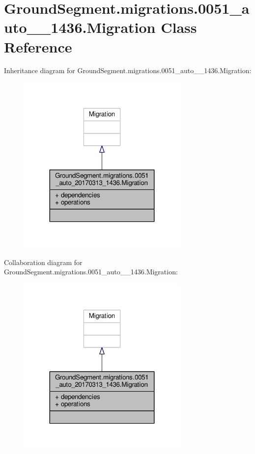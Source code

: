 \hypertarget{class_ground_segment_1_1migrations_1_10051__auto__20170313__1436_1_1_migration}{}\section{Ground\+Segment.\+migrations.0051\+\_\+auto\+\_\+\_\+1436.Migration Class Reference}
\label{class_ground_segment_1_1migrations_1_10051__auto__20170313__1436_1_1_migration}


Inheritance diagram for Ground\+Segment.\+migrations.0051\+\_\+auto\+\_\+\_\+1436.Migration\+:\nopagebreak
\begin{figure}[H]
\begin{center}
\leavevmode
\includegraphics[width=239pt]{class_ground_segment_1_1migrations_1_10051__auto__20170313__1436_1_1_migration__inherit__graph}
\end{center}
\end{figure}


Collaboration diagram for Ground\+Segment.\+migrations.0051\+\_\+auto\+\_\+\_\+1436.Migration\+:\nopagebreak
\begin{figure}[H]
\begin{center}
\leavevmode
\includegraphics[width=239pt]{class_ground_segment_1_1migrations_1_10051__auto__20170313__1436_1_1_migration__coll__graph}
\end{center}
\end{figure}
